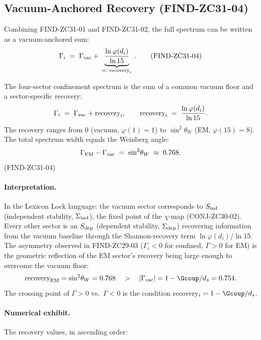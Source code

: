 \documentclass[12pt, a4paper]{article}
\begin{document}
\subsection{Vacuum-Anchored Recovery (FIND-ZC31-04)}
\label{sec:vac-anchored}

Combining FIND-ZC31-01 and FIND-ZC31-02, the full spectrum
can be written as a vacuum-anchored sum:
\begin{equation}
  \Gamma_i \;=\; \Gamma_{\rm vac}
    + \underbrace{\frac{\ln \varphi(d_i)}{\ln 15}}_{
        \;=:\;\text{recovery}_i\;}.
  \tag{FIND-ZC31-04}\label{eq:vac-anchored}
\end{equation}

\begin{derivedbox}[title={FIND-ZC31-04: Vacuum-anchored
  recovery structure}]
The four-sector confinement spectrum is the sum of a common
vacuum floor and a sector-specific recovery:
\[
  \Gamma_i \;=\; \Gamma_{\rm vac} + \text{recovery}_i,
  \qquad
  \text{recovery}_i \;=\; \frac{\ln \varphi(d_i)}{\ln 15}.
\]
The recovery ranges from $0$ (vacuum, $\varphi(1) = 1$) to
$\sin^2\!\theta_W$ (EM, $\varphi(15) = 8$). The total
spectrum width equals the Weinberg angle:
\[
  \Gamma_{\rm EM} - \Gamma_{\rm vac} \;=\; \sin^2\!\theta_W
    \;\approx\; 0.768.
\]
\hfill\textup{(FIND-ZC31-04)}
\end{derivedbox}

\paragraph{Interpretation.}
In the Lexicon Lock language: the vacuum sector corresponds to
$S_{\rm ind}$ (independent stability, $\Sigma_{\rm ind}$), the
fixed point of the $\chi$-map (CONJ-ZC30-02). Every other
sector is an $S_{\rm dep}$ (dependent stability,
$\Sigma_{\rm dep}$) recovering information from the vacuum
baseline through the Shannon-recovery term
$\ln\varphi(d_i)/\ln 15$. The asymmetry observed in
FIND-ZC29-03 ($\Gamma_i < 0$ for confined, $\Gamma > 0$ for EM)
is the geometric reflection of the EM sector's recovery being
large enough to overcome the vacuum floor:
\[
  \text{recovery}_{\rm EM} = \sin^2\!\theta_W = 0.768
  \quad>\quad |\Gamma_{\rm vac}| = 1 - \Gcoup/d_s = 0.754.
\]
The crossing point of $\Gamma > 0$ vs.\ $\Gamma < 0$ is the
condition recovery$_i = 1 - \Gcoup/d_s$.

\paragraph{Numerical exhibit.} The recovery values, in
ascending order:
\end{document}
